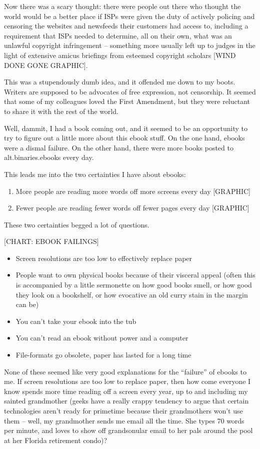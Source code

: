Now there was a scary thought: there were people out there who
thought the world would be a better place if ISPs were given the
duty of actively policing and censoring the websites and newsfeeds
their customers had access to, including a requirement that ISPs
needed to determine, all on their own, what was an unlawful
copyright infringement -- something more usually left up to judges
in the light of extensive amicus briefings from esteemed copyright
scholars [WIND DONE GONE GRAPHIC].

This was a stupendously dumb idea, and it offended me down to my
boots. Writers are supposed to be advocates of free expression, not
censorship. It seemed that some of my colleagues loved the First
Amendment, but they were reluctant to share it with the rest of the
world.

Well, dammit, I had a book coming out, and it seemed to be an
opportunity to try to figure out a little more about this ebook
stuff. On the one hand, ebooks were a dismal failure. On the other
hand, there were more books posted to alt.binaries.ebooks every
day.

This leads me into the two certainties I have about ebooks:

\begin{enumerate}
\item
  More people are reading more words off more screens every day
  [GRAPHIC]
\item
  Fewer people are reading fewer words off fewer pages every day
  [GRAPHIC]
\end{enumerate}
These two certainties begged a lot of questions.

[CHART: EBOOK FAILINGS]

\begin{itemize}
\item
  Screen resolutions are too low to effectively replace paper
\item
  People want to own physical books because of their visceral appeal
  (often this is accompanied by a little sermonette on how good books
  smell, or how good they look on a bookshelf, or how evocative an
  old curry stain in the margin can be)
\item
  You can't take your ebook into the tub
\item
  You can't read an ebook without power and a computer
\item
  File-formats go obsolete, paper has lasted for a long time
\end{itemize}
None of these seemed like very good explanations for the ``failure''
of ebooks to me. If screen resolutions are too low to replace
paper, then how come everyone I know spends more time reading off a
screen every year, up to and including my sainted grandmother
(geeks have a really crappy tendency to argue that certain
technologies aren't ready for primetime because their grandmothers
won't use them -- well, my grandmother sends me email all the time.
She types 70 words per minute, and loves to show off grandsonular
email to her pals around the pool at her Florida retirement
condo)?

